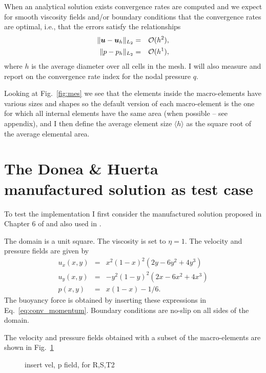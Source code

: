 \documentclass[a4paper]{article}
\begin{document}
When an analytical solution exists convergence rates are computed and 
we expect for smooth viscosity fields and/or boundary conditions that the convergence rates 
are optimal, i.e., that the errors satisfy the relationships
\begin{eqnarray}
\| {\bm u} - {\bm u}_h \|_{L_2} &=&  {\cal O}(h^{2}),     \\  
\| p - p_h \|_{L_2}   &=& {\cal O}(h^{1}),
  \label{eq:error-rates}
\end{eqnarray}
where $h$ is the average diameter over all cells in the mesh.
I will also measure and report on the convergence rate index for the nodal pressure $q$.

Looking at Fig.~\ref{fig:mes} we see that the elements inside the macro-elements 
have various sizes and shapes so 
the default version of each macro-element is the one for which all internal elements have the same area
(when possible -- see appendix), and I then define the average element size
$\langle h \rangle$ as the square root of the average elemental area.


\section{The Donea \& Huerta manufactured solution as test case}

To test the implementation I first consider the manufactured solution 
proposed in Chapter 6 of \cite{dohu03} and also used in \cite{thba22,thba25}.
 
The domain is a unit square. The viscosity is set to $\eta=1$.
The velocity and pressure fields are given by
\begin{eqnarray}
u_x(x,y) &=& x^2(1- x)^2 (2y - 6y^2 + 4y^3)  \\
u_y(x,y) &=& -y^2 (1 - y)^2 (2x - 6x^2 + 4x^3) \\
p(x,y) &=& x(1 -x)- 1/6. 
\end{eqnarray}
The buoyancy force is obtained by inserting these expressions in Eq.~\ref{eq:conv_momentum}.
Boundary conditions are no-slip on all sides of the domain.

The velocity and pressure fields obtained with a subset of the macro-elements 
are shown in Fig.~\ref{fig:dh1}


\begin{figure}[t]
{\color{red} insert vel, p field, for R,S,T2}
\caption{ \label{fig:dh1}}
\end{figure}
\end{document}
